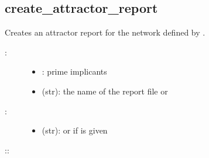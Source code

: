 \documentclass[letterpaper,10pt,english]{sphinxmanual}
\begin{document}
\subsection{create\_attractor\_report}
\label{\detokenize{Attractors:id10}}\label{\detokenize{Attractors:create-attractor-report}}

\begin{fulllineitems}
\label{\detokenize{Attractors:PyBoolNet.Attractors.create_attractor_report}}
Creates an attractor report for the network defined by .
\begin{description}
\item[{:}] \leavevmode\begin{itemize}
\item {} 
: prime implicants

\item {} 
 (str): the name of the report file or 

\end{itemize}

\item[{:}] \leavevmode\begin{itemize}
\item {} 
 (str):  or  if  is given

\end{itemize}

\item[{::}] \leavevmode
\begin{sphinxVerbatim}[commandchars=\\\{\}]
 
\end{sphinxVerbatim}

\end{description}

\end{fulllineitems}
\end{document}
